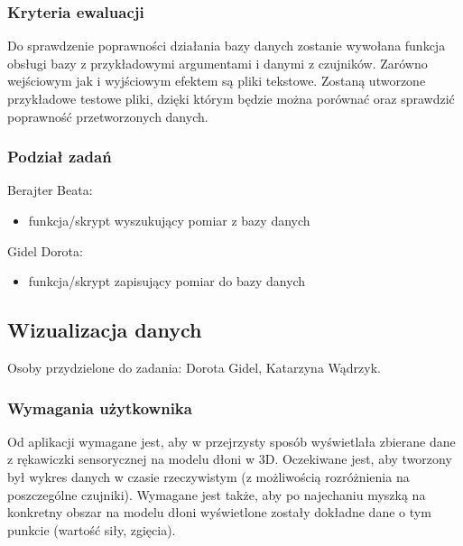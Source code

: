 \documentclass{article}
\begin{document}
\subsubsection{Kryteria ewaluacji}
Do sprawdzenie poprawności działania bazy danych zostanie wywołana funkcja obsługi bazy z przykładowymi argumentami i danymi z czujników. Zarówno wejściowym jak i wyjściowym efektem są pliki tekstowe. Zostaną utworzone przykładowe testowe pliki, dzięki którym będzie można porównać oraz sprawdzić poprawność przetworzonych danych.
\subsubsection{Podział zadań}
Berajter Beata:
\begin{itemize}
    \item funkcja/skrypt wyszukujący pomiar z bazy danych
\end{itemize}
Gidel Dorota:
\begin{itemize}
    \item funkcja/skrypt zapisujący pomiar do bazy danych
\end{itemize}

\subsection{Wizualizacja danych}
Osoby przydzielone do zadania: Dorota Gidel, Katarzyna Wądrzyk.
\subsubsection{Wymagania użytkownika}
Od aplikacji wymagane jest, aby w przejrzysty sposób wyświetlała zbierane dane z rękawiczki sensorycznej na modelu dłoni w 3D. Oczekiwane jest, aby tworzony był wykres danych w czasie rzeczywistym (z możliwością rozróżnienia na poszczególne czujniki). Wymagane jest także, aby po najechaniu myszką na konkretny obszar na modelu dłoni wyświetlone zostały dokładne dane o tym punkcie (wartość siły, zgięcia).
\end{document}
